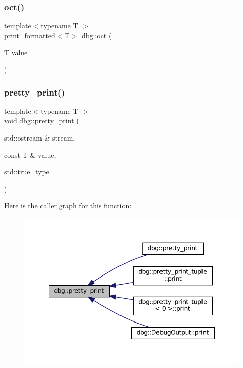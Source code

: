 \mbox{\label{namespacedbg_af52f01dbdbb25506c5cfecab4c57d52a}} 
\subsubsection{\texorpdfstring{oct()}{oct()}}
{\footnotesize\ttfamily template$<$typename T $>$ \\
\hyperlink{structdbg_1_1print__formatted}{print\+\_\+formatted}$<$T$>$ dbg\+::oct (\begin{DoxyParamCaption}\item[{T}]{value }\end{DoxyParamCaption})}

\mbox{\label{namespacedbg_a4ba5b016ce65b09fef3935a945310904}} 
\subsubsection{\texorpdfstring{pretty\+\_\+print()}{pretty\_print()}\hspace{0.1cm}{\footnotesize\ttfamily [1/19]}}
{\footnotesize\ttfamily template$<$typename T $>$ \\
void dbg\+::pretty\+\_\+print (\begin{DoxyParamCaption}\item[{std\+::ostream \&}]{stream,  }\item[{const T \&}]{value,  }\item[{std\+::true\+\_\+type}]{ }\end{DoxyParamCaption})\hspace{0.3cm}{\ttfamily [inline]}}

Here is the caller graph for this function\+:
\nopagebreak
\begin{figure}[H]
\begin{center}
\leavevmode
\includegraphics[width=348pt]{namespacedbg_a4ba5b016ce65b09fef3935a945310904_icgraph}
\end{center}
\end{figure}
\mbox{\label{namespacedbg_ab875770941388a1d8279e9b5257e5a93}} 

